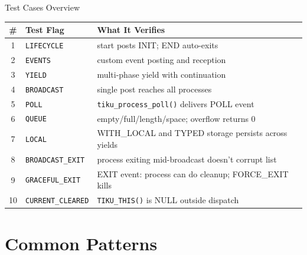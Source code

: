 \documentclass[aspectratio=169, 10pt]{beamer}
\begin{document}
\begin{frame}{Test Cases Overview}
\begin{table}
\centering
\small
\begin{tabular}{@{}clp{6.5cm}@{}}
\toprule
\textbf{\#} & \textbf{Test Flag} & \textbf{What It Verifies} \\
\midrule
1  & \texttt{LIFECYCLE}       & start posts INIT; END auto-exits \\
2  & \texttt{EVENTS}          & custom event posting and reception \\
3  & \texttt{YIELD}           & multi-phase yield with continuation \\
4  & \texttt{BROADCAST}       & single post reaches all processes \\
5  & \texttt{POLL}            & \texttt{tiku\_process\_poll()} delivers POLL event \\
6  & \texttt{QUEUE}           & empty/full/length/space; overflow returns 0 \\
7  & \texttt{LOCAL}           & WITH\_LOCAL and TYPED storage persists across yields \\
8  & \texttt{BROADCAST\_EXIT} & process exiting mid-broadcast doesn't corrupt list \\
9  & \texttt{GRACEFUL\_EXIT}  & EXIT event: process can do cleanup; FORCE\_EXIT kills \\
10 & \texttt{CURRENT\_CLEARED} & \texttt{TIKU\_THIS()} is NULL outside dispatch \\
\bottomrule
\end{tabular}
\end{table}
\end{frame}

\section{Common Patterns}
\end{document}
